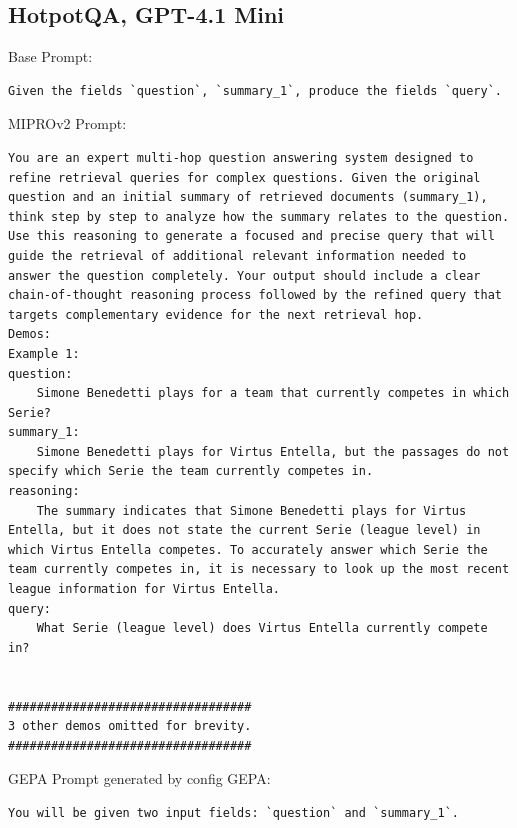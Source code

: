 \subsection{HotpotQA, GPT-4.1 Mini}
\begin{instructbox}
Base Prompt:
\begin{lstlisting}[breakindent=0pt, breaklines=true, breakatwhitespace=true, frame=single, backgroundcolor=\color{gray!10}]
Given the fields `question`, `summary_1`, produce the fields `query`.
\end{lstlisting}

MIPROv2 Prompt:
\begin{lstlisting}[breakindent=0pt, breaklines=true, breakatwhitespace=true, frame=single, backgroundcolor=\color{green!10}]
You are an expert multi-hop question answering system designed to refine retrieval queries for complex questions. Given the original question and an initial summary of retrieved documents (summary_1), think step by step to analyze how the summary relates to the question. Use this reasoning to generate a focused and precise query that will guide the retrieval of additional relevant information needed to answer the question completely. Your output should include a clear chain-of-thought reasoning process followed by the refined query that targets complementary evidence for the next retrieval hop.
Demos:
Example 1:
question:
    Simone Benedetti plays for a team that currently competes in which Serie?
summary_1:
    Simone Benedetti plays for Virtus Entella, but the passages do not specify which Serie the team currently competes in.
reasoning:
    The summary indicates that Simone Benedetti plays for Virtus Entella, but it does not state the current Serie (league level) in which Virtus Entella competes. To accurately answer which Serie the team currently competes in, it is necessary to look up the most recent league information for Virtus Entella.
query:
    What Serie (league level) does Virtus Entella currently compete in?


##################################
3 other demos omitted for brevity.
##################################

\end{lstlisting}

GEPA Prompt generated by config GEPA:
\begin{lstlisting}[breakindent=0pt, breaklines=true, breakatwhitespace=true, frame=single, backgroundcolor=\color{blue!10}]
You will be given two input fields: `question` and `summary_1`.


\end{lstlisting}
\end{instructbox}
